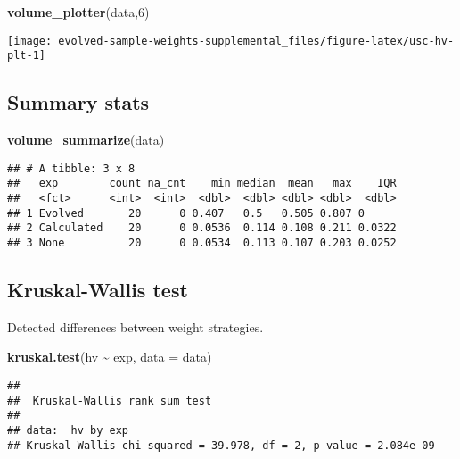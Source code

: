 \documentclass[
]{book}
\newenvironment{Shaded}{\begin{snugshade}}{\end{snugshade}}
\newcommand{\AttributeTok}[1]{\textcolor[rgb]{0.13,0.29,0.53}{#1}}
\newcommand{\DecValTok}[1]{\textcolor[rgb]{0.00,0.00,0.81}{#1}}
\newcommand{\FunctionTok}[1]{\textcolor[rgb]{0.13,0.29,0.53}{\textbf{#1}}}
\newcommand{\NormalTok}[1]{#1}
\newcommand{\SpecialCharTok}[1]{\textcolor[rgb]{0.81,0.36,0.00}{\textbf{#1}}}
\begin{document}
\begin{Shaded}
\begin{Highlighting}[]
\FunctionTok{volume\_plotter}\NormalTok{(data,}\DecValTok{6}\NormalTok{)}
\end{Highlighting}
\end{Shaded}

\texttt{[image: evolved-sample-weights-supplemental\_files/figure-latex/usc-hv-plt-1]}

\hypertarget{summary-stats-5}{%
\subsection{Summary stats}\label{summary-stats-5}}

\begin{Shaded}
\begin{Highlighting}[]
\FunctionTok{volume\_summarize}\NormalTok{(data)}
\end{Highlighting}
\end{Shaded}

\begin{verbatim}
## # A tibble: 3 x 8
##   exp        count na_cnt    min median  mean   max    IQR
##   <fct>      <int>  <int>  <dbl>  <dbl> <dbl> <dbl>  <dbl>
## 1 Evolved       20      0 0.407   0.5   0.505 0.807 0     
## 2 Calculated    20      0 0.0536  0.114 0.108 0.211 0.0322
## 3 None          20      0 0.0534  0.113 0.107 0.203 0.0252
\end{verbatim}

\hypertarget{kruskal-wallis-test-5}{%
\subsection{Kruskal-Wallis test}\label{kruskal-wallis-test-5}}

Detected differences between weight strategies.

\begin{Shaded}
\begin{Highlighting}[]
\FunctionTok{kruskal.test}\NormalTok{(hv }\SpecialCharTok{\textasciitilde{}}\NormalTok{ exp, }\AttributeTok{data =}\NormalTok{ data)}
\end{Highlighting}
\end{Shaded}

\begin{verbatim}
## 
##  Kruskal-Wallis rank sum test
## 
## data:  hv by exp
## Kruskal-Wallis chi-squared = 39.978, df = 2, p-value = 2.084e-09
\end{verbatim}
\end{document}
